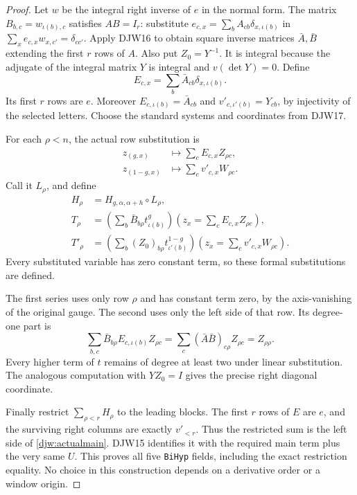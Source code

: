 \begin{proof}
Let $w$ be the integral right inverse of $e$ in the normal form.
The matrix $B_{b,c}=w_{\iota(b),c}$ satisfies $AB=I_r$:
substitute $e_{c,x}=\sum_bA_{cb}\delta_{x,\iota(b)}$ in
$\sum_xe_{c,x}w_{x,c'}=\delta_{cc'}$.
Apply DJW16 to obtain square inverse matrices $\bar A,\bar B$
extending the first $r$ rows of $A$.
Also put $Z_0=Y^{-1}$.  It is integral because the adjugate of
the integral matrix $Y$ is integral and $v(\det Y)=0$.
Define
\[
 E_{c,x}=\sum_b\bar A_{cb}\delta_{x,\iota(b)}.
\]
Its first $r$ rows are $e$.  Moreover
$E_{c,\iota(b)}=\bar A_{cb}$ and
$v'_{c,\iota'(b)}=Y_{cb}$, by injectivity of the selected letters.
Choose the standard systems and coordinates from DJW17.

For each $\rho<n$, the actual row substitution is
\begin{align*}
 z_{(g,x)}&\longmapsto\sum_cE_{c,x}Z_{\rho c},\\
 z_{(1-g,x)}&\longmapsto\sum_cv'_{c,x}W_{\rho c}.
\end{align*}
Call it $L_\rho$, and define
\begin{align*}
 H_\rho&=H_{g,\alpha,\alpha+h}\circ L_\rho,\\
 T_\rho&=
 \left(\sum_b\bar B_{b\rho}t^g_{\iota(b)}\right)
       \left(z_x=\sum_cE_{c,x}Z_{\rho c}\right),\\
 T'_\rho&=
 \left(\sum_b(Z_0)_{b\rho}t^{1-g}_{\iota'(b)}\right)
       \left(z_x=\sum_cv'_{c,x}W_{\rho c}\right).
\end{align*}
Every substituted variable has zero constant term, so these formal
substitutions are defined.

The first series uses only row $\rho$ and has constant term zero,
by the axis-vanishing of the original gauge.  The second uses only
the left side of that row.  Its degree-one part is
\[
 \sum_{b,c}\bar B_{b\rho}E_{c,\iota(b)}Z_{\rho c}
       =\sum_c(\bar A\bar B)_{c\rho}Z_{\rho c}
       =Z_{\rho\rho}.
\]
Every higher term of $t$ remains of degree at least two under
linear substitution.  The analogous computation with $YZ_0=I$
gives the precise right diagonal coordinate.

Finally restrict $\sum_{\rho<r}H_\rho$ to the leading blocks.
The first $r$ rows of $E$ are $e$, and the surviving right
columns are exactly $v'_{<r}$.  Thus the restricted sum is the
left side of \eqref{djw:actualmain}.  DJW15 identifies it with
the required main term plus the very same $U$.
This proves all five \texttt{BiHyp} fields, including the exact
restriction equality.  No choice in this construction depends
on a derivative order or a window origin.
\end{proof}

